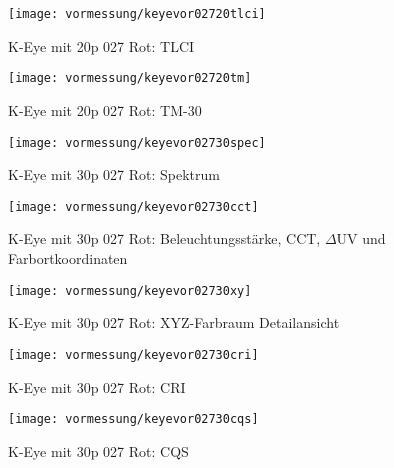 \documentclass[pagesize,paper=A4,fontsize=12pt,utf8,numbers=noenddot,bibliography=totoc,listof=totoc,DIV=11,BCOR=1mm]{scrreprt}
\begin{document}
\begin{figure}[htp]     %
\centering
\texttt{[image: vormessung/keyevor02720tlci]} 
\caption {K-Eye mit 20p 027 Rot: TLCI} 
\end{figure}

\begin{figure}[htp]     %
\centering
\texttt{[image: vormessung/keyevor02720tm]} 
\caption {K-Eye mit 20p 027 Rot: TM-30} 
\end{figure}



\begin{figure}[htp]     %
\centering
\texttt{[image: vormessung/keyevor02730spec]} 
\caption {K-Eye mit 30p 027 Rot: Spektrum} 
\end{figure}

\begin{figure}[htp]     %
\centering
\texttt{[image: vormessung/keyevor02730cct]} 
\caption {K-Eye mit 30p 027 Rot: Beleuchtungsstärke, CCT, $\Delta$UV und Farbortkoordinaten} 
\end{figure}

\begin{figure}[htp]     %
\centering
\texttt{[image: vormessung/keyevor02730xy]} 
\caption {K-Eye mit 30p 027 Rot: XYZ-Farbraum Detailansicht} 
\end{figure}

\begin{figure}[htp]     %
\centering
\texttt{[image: vormessung/keyevor02730cri]} 
\caption {K-Eye mit 30p 027 Rot: CRI} 
\end{figure}

\begin{figure}[htp]     %
\centering
\texttt{[image: vormessung/keyevor02730cqs]} 
\caption {K-Eye mit 30p 027 Rot: CQS} 
\end{figure}
\end{document}
